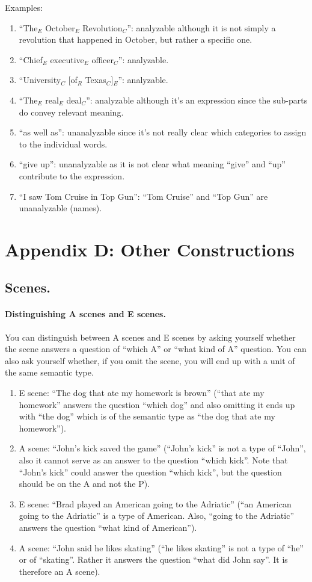 \documentclass[11pt]{article}
\newcommand{\be}{\begin{enumerate}}
\newcommand{\ee}{\end{enumerate}}
\begin{document}
Examples:

\begin{enumerate}
\item
``The$_E$ October$_E$ Revolution$_C$'': analyzable although it is not
simply a revolution that happened in October, but rather a specific one.
\item
``Chief$_E$ executive$_E$ officer$_C$'': analyzable.
\item
``University$_C$ [of$_R$ Texas$_C$]$_E$'': analyzable.
\item
``The$_E$ real$_E$ deal$_C$'': analyzable although it's an expression
since the sub-parts do convey relevant meaning.
\item
``as well as'': unanalyzable since it's not really clear which
categories to assign to the individual words.
\item
``give up'': unanalyzable as it is not clear what meaning ``give'' and ``up'' contribute to the expression.
\item
``I saw Tom Cruise in Top Gun'': ``Tom Cruise'' and ``Top Gun'' are unanalyzable (names).
\end{enumerate}


\section*{\large Appendix D: Other Constructions}


\subsection*{Scenes.}

\paragraph{Distinguishing A scenes and E scenes.} You can distinguish between A scenes
and E scenes by asking yourself whether the scene answers a question of
``which A'' or ``what kind of A'' question. You can also ask yourself whether,
if you omit the scene, you will end up with a unit of the same semantic
type.
\be
\item
E scene: ``The dog that ate my homework is brown'' (``that ate my homework''
answers the question ``which dog'' and also omitting it ends up with ``the
dog'' which is of the semantic type as ``the dog that ate my homework'').
\item
A scene: ``John's kick saved the game'' (``John's kick'' is not a type of
``John'', also it cannot serve as an answer to the question ``which kick''.
Note that ``John's kick'' could answer the question ``which kick'', but the
question should be on the A and not the P).
\item
E scene: ``Brad played an American going to the Adriatic'' (``an American
going to the Adriatic'' is a type of American. Also, ``going to the Adriatic''
answers the question ``what kind of American'').
\item
A scene: ``John said he likes skating'' (``he likes skating'' is not a type of
``he'' or of ``skating''. Rather it answers the question ``what did John say''.
It is therefore an A scene).
\ee
\end{document}
